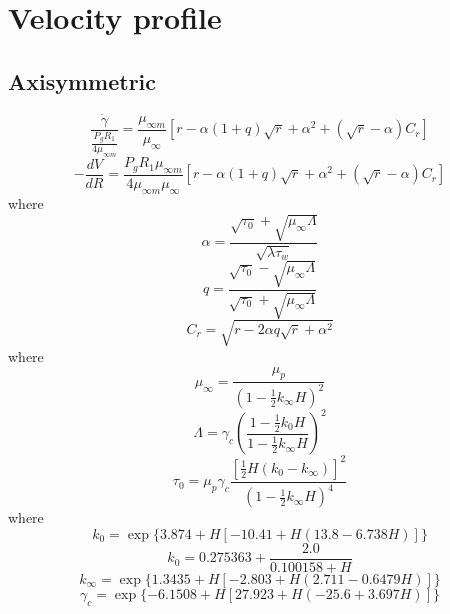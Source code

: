 \newpage
\section{Velocity profile}
\subsection{Axisymmetric}
\begin{equation}
\frac{\dot{\gamma}}{\frac{P_g R_1}{4 \mu_{\infty m}}} = \frac{\mu_{\infty m}}
{\mu_\infty} [r - \alpha (1 + q) \sqrt{r} + \alpha^2 + (\sqrt{r} - 
\alpha) C_r]
\end{equation}
\begin{equation}
-\frac{dV}{dR} = \frac{P_g R_1 \mu_{\infty m}}{4 \mu_{\infty m} \mu_\infty}
[r - \alpha (1 + q) \sqrt{r} + \alpha^2 + (\sqrt{r} - \alpha) C_r]
\end{equation}
where
\begin{equation*}
\alpha = \frac{\sqrt{\tau_0} + \sqrt{\mu_\infty \Lambda}}{\sqrt{\lambda \tau_w}}
\end{equation*}
\begin{equation}
q = \frac{\sqrt{\tau_0} - \sqrt{\mu_\infty \Lambda}}{\sqrt{\tau_0} + 
\sqrt{\mu_\infty \Lambda}}
\end{equation}
\begin{equation*}
C_r = \sqrt{r - 2 \alpha q \sqrt{r} + \alpha^2}
\end{equation*}
where
\begin{equation*}
\mu_\infty = \frac{\mu_p}{(1 - \frac{1}{2}k_\infty H)^2}
\end{equation*}
\begin{equation}
\Lambda = \gamma_c \left(\frac{1 - \frac{1}{2} k_0 H}
{1 - \frac{1}{2} k_\infty H} \right)^2
\end{equation}
\begin{equation*}
\tau_0 = \mu_p \gamma_c \frac{\left[\frac{1}{2} H(k_0 - k_\infty) \right]^2}
{\left(1 - \frac{1}{2} k_\infty H \right)^4}
\end{equation*}
where
\begin{equation*}
k_0 = \exp{\{3.874 + H[-10.41 + H(13.8 - 6.738 H)]\}}
\end{equation*}
\begin{equation*}
k_0 = 0.275363 + \frac{2.0}{0.100158 + H}
\end{equation*}
\begin{equation}
k_\infty = \exp{\{1.3435 + H[-2.803 + H(2.711 - 0.6479 H)]\}}
\end{equation}
\begin{equation*}
\gamma_c = \exp{\{-6.1508 + H[27.923 + H(-25.6 + 3.697 H)]\}}
\end{equation*}